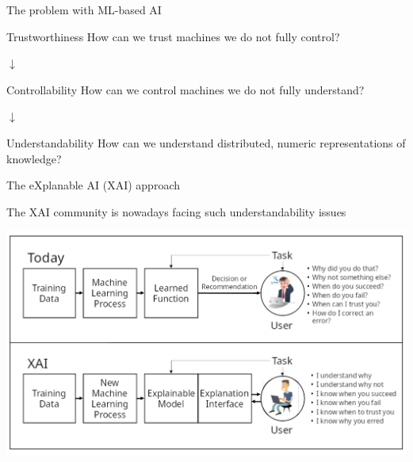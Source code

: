 \documentclass[presentation]{beamer}\mode<presentation>{\usetheme{AMSBolognaFC}}
\begin{document}
\begin{frame}[c]{The problem with ML-based AI}
    \centering
    
    \begin{exampleblock}{Trustworthiness}
        \centering
        How can we \alert{trust} machines we do not fully \alert{control}?
    \end{exampleblock}
    
    \vfill$\downarrow$\vfill
    
    \begin{block}{Controllability}
        \centering
        How can we \alert{control} machines we do not fully \alert{understand}?
    \end{block}
    
    \vfill$\downarrow$\vfill
    
    \begin{alertblock}{Understandability}
        \centering
        How can we \alert{understand} distributed, \alert{numeric} representations of knowledge?
    \end{alertblock}
    
\end{frame}

\begin{frame}{The eXplanable AI (XAI) approach}

    The \alert{XAI} community is nowadays facing such understandability issues

    \vfill
    
    \begin{center}
        \includegraphics[width=\linewidth]{figures/xai-concept.pdf}
    \end{center}
\end{frame}

\end{document}
